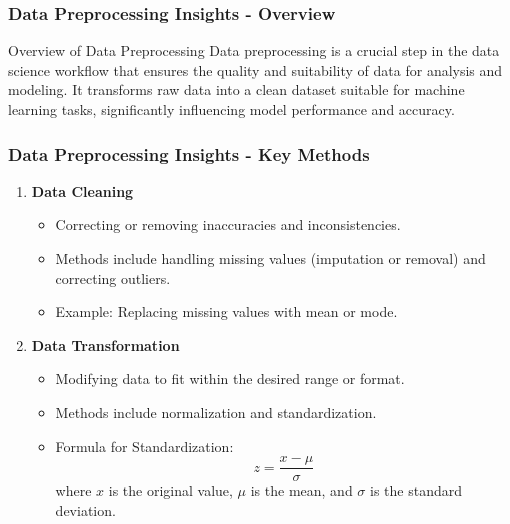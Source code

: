 \documentclass[aspectratio=169]{beamer}
\begin{document}
\begin{frame}[fragile]
    \frametitle{Data Preprocessing Insights - Overview}
    \begin{block}{Overview of Data Preprocessing}
        Data preprocessing is a crucial step in the data science workflow that ensures the quality and suitability of data for analysis and modeling. 
        It transforms raw data into a clean dataset suitable for machine learning tasks, significantly influencing model performance and accuracy.
    \end{block}
\end{frame}

\begin{frame}[fragile]
    \frametitle{Data Preprocessing Insights - Key Methods}
    \begin{enumerate}
        \item \textbf{Data Cleaning}
            \begin{itemize}
                \item Correcting or removing inaccuracies and inconsistencies.
                \item Methods include handling missing values (imputation or removal) and correcting outliers.
                \item Example: Replacing missing values with mean or mode.
            \end{itemize}
        
        \item \textbf{Data Transformation}
            \begin{itemize}
                \item Modifying data to fit within the desired range or format.
                \item Methods include normalization and standardization.
                \item Formula for Standardization:  
                \begin{equation}
                z = \frac{x - \mu}{\sigma}
                \end{equation}
                where \( x \) is the original value, \( \mu \) is the mean, and \( \sigma \) is the standard deviation.
            \end{itemize}
    \end{enumerate}
\end{frame}
\end{document}
